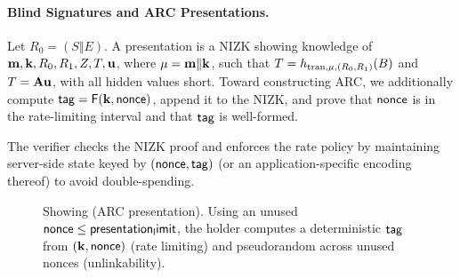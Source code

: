 \paragraph{Blind Signatures and ARC Presentations.}
Let \(R_0=(S\Vert E)\). A presentation is a NIZK showing knowledge of
\(\mathbf{m},\mathbf{k},R_0,R_1,Z,T,\mathbf{u}\), where \(\mathbf{\mu}=\mathbf{m}\Vert \mathbf{k}\), such that
\(T=h_{\mathrm{tran},\mathbf{\mu},(R_0,R_1)}(B)\) and \(T=\mathbf{A}\mathbf{u}\), with all hidden values short. Toward constructing ARC,
we additionally compute \(\mathsf{tag}=\mathsf{F}(\mathbf{k},\mathsf{nonce})\), append it to the NIZK, and prove that \(\mathsf{nonce}\) is in the
rate-limiting interval and that \(\mathsf{tag}\) is well-formed.

The verifier checks the NIZK proof and enforces the rate policy by maintaining server-side state keyed by
\((\mathsf{nonce},\mathsf{tag})\) (or an application-specific encoding thereof) to avoid double-spending.

\begin{figure}[h]
	\centering
	\caption{Showing (ARC presentation). Using an unused $\mathsf{nonce}\leq
		\mathsf{presentation_limit}$, the holder computes a deterministic $\mathsf{tag}$
		from $(\mathbf{k},\mathsf{nonce})$ (rate limiting) and pseudorandom across unused nonces (unlinkability).}
	\label{fig:showing-flow}
\end{figure}

